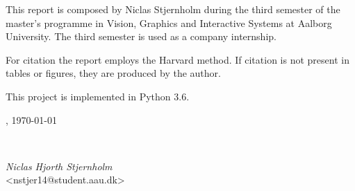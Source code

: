 This report is composed by Niclas Stjernholm during the third semester of the master's programme in Vision, Graphics and Interactive Systems at Aalborg University. The third semester is used as a company internship.

For citation the report employs the Harvard method. If citation is not present in tables or figures, they are produced by the author.

This project is implemented in Python 3.6.

\vspace{\baselineskip}\hfill \AAU, \today
\vfill\noindent
\begin{center}
\
\begin{minipage}[b]{0.45\textwidth}
  \centering
  \textit{Niclas Hjorth Stjernholm}\\
  {\footnotesize <nstjer14@student.aau.dk>}
\end{minipage}

\end{center}
